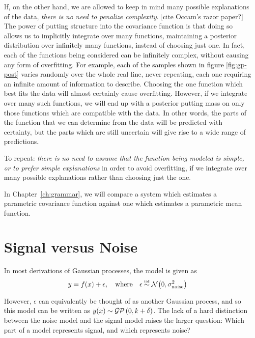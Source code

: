 If, on the other hand, we are allowed to keep in mind many possible explanations of the data, \emph{there is no need to penalize complexity}. [cite Occam's razor paper?]
The power of putting structure into the covariance function is that doing so allows us to implicitly integrate over many functions, maintaining a posterior distribution over infinitely many functions, instead of choosing just one.
In fact, each of the functions being considered can be infinitely complex, without causing any form of overfitting.
For example, each of the samples shown in figure \ref{fig:gp-post} varies randomly over the whole real line, never repeating, each one requiring an infinite amount of information to describe.
Choosing the one function which best fits the data will almost certainly cause overfitting.
However, if we integrate over many such functions, we will end up with a posterior putting mass on only those functions which are compatible with the data.
In other words, the parts of the function that we can determine from the data will be predicted with certainty, but the parts which are still uncertain will give rise to a wide range of predictions.

To repeat: \emph{there is no need to assume that the function being modeled is simple, or to prefer simple explanations} in order to avoid overfitting, if we integrate over many possible explanations rather than choosing just the one.

In Chapter~\ref{ch:grammar}, we will compare a system which estimates a parametric covariance function against one which estimates a parametric mean function.


\section{Signal versus Noise}

In most derivations of Gaussian processes, the model is given as
%
\begin{align}
y = f(x) + \epsilon, \quad \textnormal{where} \quad \epsilon \overset{\mbox{\tiny iid}}{\sim} \mathcal{N}\!\left(0,\sigma^2_{\textnormal{noise}}\right)
\end{align}

However, $\epsilon$ can equivalently be thought of as another Gaussian process, and so this model can be written as $y(x) \sim \mathcal{GP}\left(0, k + \delta \right)$.  The lack of a hard distinction between the noise model and the signal model raises the larger question:  Which part of a model represents signal, and which represents noise?

